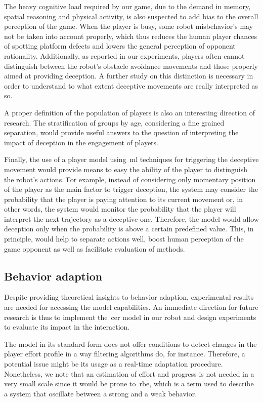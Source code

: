 The heavy cognitive load required by our game, due to the demand in memory, spatial reasoning and  physical activity, is also suspected to add bias to the overall perception of the game. When the player is busy, some robot misbehavior's may not be taken into account properly, which thus reduces the human player chances of spotting platform defects and lowers the general perception of opponent rationality. Additionally, as reported in our experiments, players often cannot distinguish between the robot's obstacle avoidance movements and those properly aimed at providing deception. A further study on this distinction is necessary in order to understand to what extent deceptive movements are really interpreted as so.

A proper definition of the population of players is also an interesting direction of research. The stratification of groups by age, considering a fine grained separation, would provide useful answers to the question of interpreting the impact of deception in the engagement of players.

Finally, the use of a player model using~\gls{ml} techniques for triggering the deceptive movement would provide means to easy the ability of the player to distinguish the robot's actions. For example, instead of considering only momentary position of the player as the main factor to trigger deception, the system may consider the probability that the player is paying attention to its current movement or, in other words, the system would monitor the probability that the player will interpret the next trajectory as a deceptive one. Therefore, the model would allow deception only when the probability is above a certain predefined value. This, in principle, would help to separate actions well, boost human perception of the game opponent as well as facilitate evaluation of methods.

\subsection{Behavior adaption}
Despite providing theoretical insights to behavior adaption, experimental results are needed for accessing the model capabilities. An immediate direction for future research is thus to implement the~\gls{cer} model in our robot and design experiments to evaluate its impact in the interaction. 

The model in its standard form does not offer conditions to detect changes in the player effort profile in a way filtering algorithms do, for instance. Therefore, a potential issue might be its usage as a real-time adaptation procedure. Nonetheless, we note that an estimation of effort and progress is not needed in a very small scale since it would be prone to~\glsdesc{rbe}, which is a term used to describe a system that oscillate between a strong and a weak behavior. 


